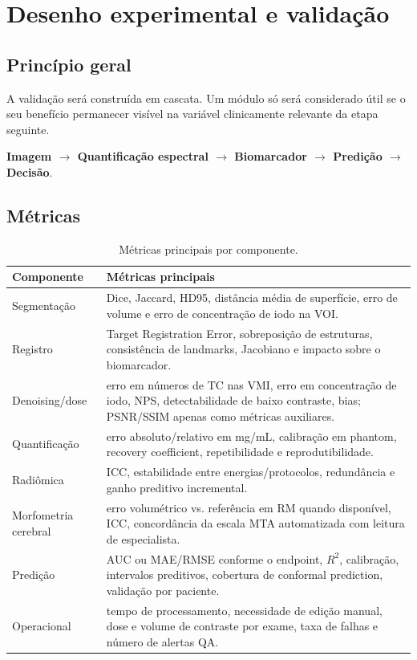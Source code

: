 \documentclass[11pt,a4paper]{article}
\begin{document}
\section{Desenho experimental e validação}

\subsection{Princípio geral}

A validação será construída em cascata. Um módulo só será considerado útil se o seu benefício permanecer visível na variável clinicamente relevante da etapa seguinte.

\begin{center}
\textbf{Imagem $\rightarrow$ Quantificação espectral $\rightarrow$ Biomarcador $\rightarrow$ Predição $\rightarrow$ Decisão}.
\end{center}

\subsection{Métricas}

\begin{table}[htbp]
\centering
\caption{Métricas principais por componente.}
\begin{tabular}{p{3.4cm}p{10.2cm}}
\toprule
\textbf{Componente} & \textbf{Métricas principais}\\
\midrule
Segmentação & Dice, Jaccard, HD95, distância média de superfície, erro de volume e erro de concentração de iodo na VOI.\\
Registro & Target Registration Error, sobreposição de estruturas, consistência de landmarks, Jacobiano e impacto sobre o biomarcador.\\
Denoising/dose & erro em números de TC nas VMI, erro em concentração de iodo, NPS, detectabilidade de baixo contraste, bias; PSNR/SSIM apenas como métricas auxiliares.\\
Quantificação & erro absoluto/relativo em mg/mL, calibração em phantom, recovery coefficient, repetibilidade e reprodutibilidade.\\
Radiômica & ICC, estabilidade entre energias/protocolos, redundância e ganho preditivo incremental.\\
Morfometria cerebral & erro volumétrico vs. referência em RM quando disponível, ICC, concordância da escala MTA automatizada com leitura de especialista.\\
Predição & AUC ou MAE/RMSE conforme o endpoint, $R^{2}$, calibração, intervalos preditivos, cobertura de conformal prediction, validação por paciente.\\
Operacional & tempo de processamento, necessidade de edição manual, dose e volume de contraste por exame, taxa de falhas e número de alertas QA.\\
\bottomrule
\end{tabular}
\end{table}
\end{document}
